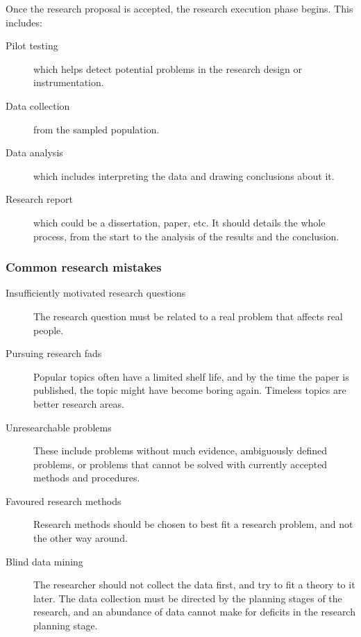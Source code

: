 
Once the research proposal is accepted, the research execution phase
begins. This includes:
\begin{adjustwidth}{0.5cm}{}
\begin{description}
  \item[Pilot testing] which helps detect potential problems in the
    research design or instrumentation.
  \item[Data collection] from the sampled population.
  \item[Data analysis] which includes interpreting the data and
    drawing conclusions about it.
  \item[Research report] which could be a dissertation, paper, etc. It
    should details the whole process, from the start to the analysis
    of the results and the conclusion.
\end{description}
\end{adjustwidth}

\subsubsection{Common research mistakes}

\begin{description}
  \item[Insufficiently motivated research questions] The research
    question must be related to a real problem that affects real people.
  \item[Pursuing research fads] Popular topics often have a limited
    shelf life, and by the time the paper is published, the topic
    might have become boring again. Timeless topics are better
    research areas.
  \item[Unresearchable problems] These include problems without much
    evidence, ambiguously defined problems, or problems that cannot be
    solved with currently accepted methods and procedures.
  \item[Favoured research methods] Research methods should be chosen
    to best fit a research problem, and not the other way around.
  \item[Blind data mining] The researcher should not collect the data
    first, and try to fit a theory to it later. The data collection
    must be directed by the planning stages of the research, and an
    abundance of data cannot make for deficits in the research
    planning stage.
\end{description}

